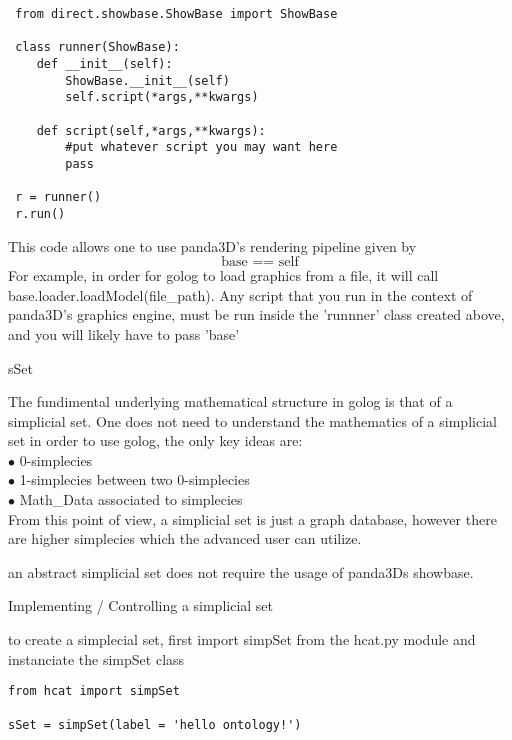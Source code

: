 \documentclass{article}
\begin{document}
 \begin{lstlisting}
 from direct.showbase.ShowBase import ShowBase
 
 class runner(ShowBase):
    def __init__(self):
        ShowBase.__init__(self)
        self.script(*args,**kwargs)
    
    def script(self,*args,**kwargs):
        #put whatever script you may want here
        pass

 r = runner()
 r.run()
 \end{lstlisting}

This code allows one to use panda3D's rendering pipeline given by $$\text{base == self}$$ For example, in order for golog to load graphics from a file, it will call\\ base.loader.loadModel(file\_path). Any script that you run in the context of panda3D's graphics engine, must be run inside the 'runnner' class created above, and you will likely have to pass 'base'
 
 
 \newpage
 \begin{section}{sSet}
 \end{section}
 
 The fundimental underlying mathematical structure in golog is that of a simplicial set. One does not need to understand the mathematics of a simplicial set in order to use golog, the only key ideas are:\\
 
 
 \noindent $\bullet$ 0-simplecies\\
 $\bullet$ 1-simplecies between two 0-simplecies\\
 $\bullet$ Math\_Data associated to simplecies\\
 
 From this point of view, a simplicial set is just a graph database, however there are higher simplecies which the advanced user can utilize.  
 
an abstract simplicial set does not require the usage of panda3Ds showbase.\\

\begin{subsection}{Implementing / Controlling a simplicial set}
\end{subsection}

to create a simplecial set, first import simpSet from the hcat.py module and instanciate the simpSet class

\begin{lstlisting}
from hcat import simpSet

sSet = simpSet(label = 'hello ontology!')
\end{lstlisting}
\end{document}
